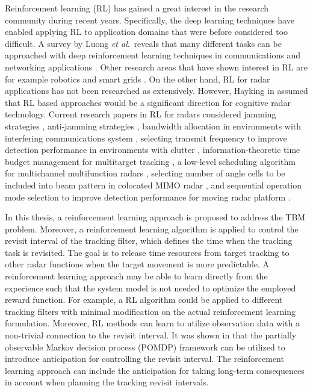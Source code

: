 \documentclass[english, 12pt, a4paper, elec, utf8, a-1b, online]{aaltothesis}
\newcommand{\etal}{\textit{et al}.~}
\begin{document}
Reinforcement learning (RL) has gained a great interest in the research community during recent years.
Specifically, the deep learning techniques have enabled applying RL to application domains that were before considered too difficult.
A survey by Luong \etal reveals that many different tasks can be approached with deep reinforcement learning techniques in communications and networking applications \cite{Luong2018}.
Other research areas that have shown interest in RL are for example robotics \cite{Kober2013} and smart grids \cite{Zhang2018}.
On the other hand, 
RL for radar applications has not been researched as extensively.
However, Hayking in \cite{Haykin2006} assumed that RL based approaches would be a significant direction for cognitive radar technology.
Current research papers in RL for radars considered 
jamming strategies \cite{Qiang2017, Wang2019, Wang2019a, Zhang2019},
anti-jamming strategies \cite{Kang2018, Ak2019}, 
bandwidth allocation in environments with interfering communications system \cite{Selvi2018, Kozy2019},
selecting transmit frequency to improve detection performance in environments with clutter \cite{Wabeke2010}, 
information-theoretic time budget management for multitarget tracking \cite{Kreucher2005, Xu2010},
a low-level scheduling algorithm for multichannel multifunction radars \cite{Shaghaghi2018},
selecting number of angle cells to be included into beam pattern in colocated MIMO radar \cite{Wang2018}, 
and sequential operation mode selection to improve detection performance for moving radar platform \cite{Smits2008}.

In this thesis, a reinforcement learning approach is proposed to address the TBM problem.
Moreover, a reinforcement learning algorithm is applied to control the revisit interval of the tracking filter, 
which defines the time when the tracking task is revisited.
The goal is to release time resources from target tracking to other radar functions when the target movement is more predictable.
A reinforcement learning approach may be able to learn directly from the experience such that the system model is not needed to optimize the employed reward function.
For example, a RL algorithm could be applied to different tracking filters with minimal modification on the actual reinforcement learning formulation.  
Moreover, RL methods can learn to utilize observation data with a non-trivial connection to the revisit interval.
It was shown in \cite{Charlish2015} that the partially observable Markov decision process (POMDP) framework can be utilized to introduce anticipation for controlling the revisit interval.
The reinforcement learning approach can include the anticipation for taking long-term consequences in account when planning the 
tracking revisit intervals.
\end{document}
